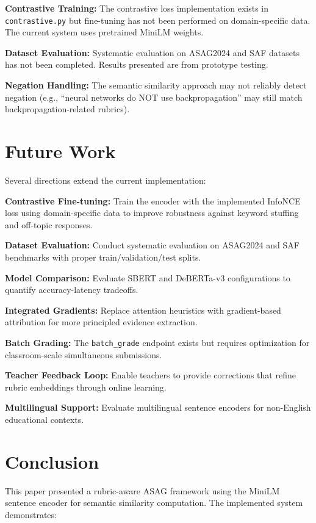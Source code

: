 \documentclass[conference]{IEEEtran}
\begin{document}
\textbf{Contrastive Training:} The contrastive loss implementation exists in \texttt{contrastive.py} but fine-tuning has not been performed on domain-specific data. The current system uses pretrained MiniLM weights.

\textbf{Dataset Evaluation:} Systematic evaluation on ASAG2024 and SAF datasets has not been completed. Results presented are from prototype testing.

\textbf{Negation Handling:} The semantic similarity approach may not reliably detect negation (e.g., ``neural networks do NOT use backpropagation'' may still match backpropagation-related rubrics).

\section{Future Work}
Several directions extend the current implementation:

\textbf{Contrastive Fine-tuning:} Train the encoder with the implemented InfoNCE loss using domain-specific data to improve robustness against keyword stuffing and off-topic responses.

\textbf{Dataset Evaluation:} Conduct systematic evaluation on ASAG2024 and SAF benchmarks with proper train/validation/test splits.

\textbf{Model Comparison:} Evaluate SBERT and DeBERTa-v3 configurations to quantify accuracy-latency tradeoffs.

\textbf{Integrated Gradients:} Replace attention heuristics with gradient-based attribution for more principled evidence extraction.

\textbf{Batch Grading:} The \texttt{batch\_grade} endpoint exists but requires optimization for classroom-scale simultaneous submissions.

\textbf{Teacher Feedback Loop:} Enable teachers to provide corrections that refine rubric embeddings through online learning.

\textbf{Multilingual Support:} Evaluate multilingual sentence encoders for non-English educational contexts.

\section{Conclusion}
This paper presented a rubric-aware ASAG framework using the MiniLM sentence encoder for semantic similarity computation. The implemented system demonstrates:
\end{document}
